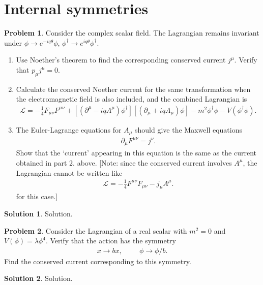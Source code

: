 \documentclass{book}
\numberwithin{equation}{section}
\theoremstyle{definition}
\newtheorem{prob}{Problem}[section]
\newtheorem{sln}{Solution}[section]
\newcommand{\p}{\partial}
\newcommand{\lag}{\mathcal{L}}
\begin{document}
\newpage

\section{Internal symmetries}

\begin{prob}
	Consider the complex scalar field. The Lagrangian remains invariant under $\phi\to e^{-iq\theta}\phi$, $\phi^\dagger \to e^{iq\theta}\phi^\dagger$. 
	\begin{enumerate}
		\item Use Noether's theorem to find the corresponding conserved current $j^\mu$. Verify that $p_\mu j^\mu = 0$.
		\item Calculate the conserved Noether current for the same transformation when the electromagnetic field is also included, and the combined Lagrangian is
		\begin{align}
		\lag = -\frac{1}{4}F_{\mu\nu}F^{\mu\nu} + \left[(\p^\mu -iq A^\mu)\phi^\dagger \right]\left[(\p_\mu + iq A_\mu)\phi\right] - m^2\phi^\dagger\phi - V(\phi^\dagger\phi).
		\end{align}
		\item The Euler-Lagrange equations for $A_\mu$ should give the Maxwell equations
		\begin{align}
		\p_\mu F^{\mu\nu} = j^\nu.
		\end{align}
		Show that the `current' appearing in this equation is the same as the current obtained in part 2. above. [Note: since the conserved current involves $A^\mu$, the Lagrangian cannot be written like
		\begin{align}
		\lag = -\frac{1}{4}F^{\mu\nu}F_{\mu\nu} - j_\mu A^\mu.
		\end{align}
		for this case.]\\
	\end{enumerate}

	\begin{sln}
		Solution.
	\end{sln}
\end{prob}





\newpage

\begin{prob}
	Consider the Lagrangian of a real scalar with $m^2 = 0$ and $V(\phi) = \lambda \phi^4$. Verify that the action has the symmetry
	\begin{align}
	x\to bx, \hspace{1cm} \phi \to \phi/b. 
	\end{align}
	Find the conserved current corresponding to this symmetry.\\
	
	\begin{sln}
		Solution.
	\end{sln}
\end{prob}
\end{document}
